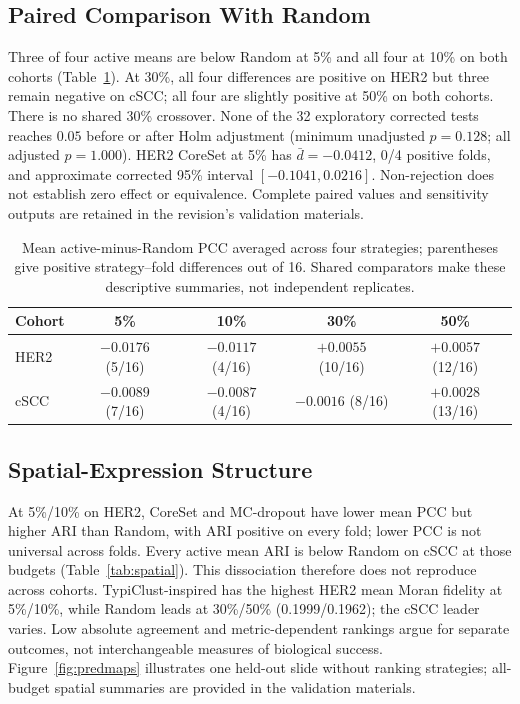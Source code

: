 \documentclass[]{spie}
\begin{document}
\subsection{Paired Comparison With Random}

Three of four active means are below Random at 5\% and all four at 10\% on both cohorts (Table~\ref{tab:paired}). At 30\%, all four differences are positive on HER2 but three remain negative on cSCC; all four are slightly positive at 50\% on both cohorts. There is no shared 30\% crossover. None of the 32 exploratory corrected tests reaches $0.05$ before or after Holm adjustment (minimum unadjusted $p=0.128$; all adjusted $p=1.000$). HER2 CoreSet at 5\% has $\bar d=-0.0412$, 0/4 positive folds, and approximate corrected 95\% interval $[-0.1041,0.0216]$. Non-rejection does not establish zero effect or equivalence. Complete paired values and sensitivity outputs are retained in the revision's validation materials.

\begin{table}[htbp]
\centering
\caption{Mean active-minus-Random PCC averaged across four strategies; parentheses give positive strategy--fold differences out of 16. Shared comparators make these descriptive summaries, not independent replicates.}
\label{tab:paired}
\begin{tabular}{lcccc}
\hline
Cohort & 5\% & 10\% & 30\% & 50\% \\
\hline
HER2 & $-0.0176$ (5/16) & $-0.0117$ (4/16) & $+0.0055$ (10/16) & $+0.0057$ (12/16) \\
cSCC & $-0.0089$ (7/16) & $-0.0087$ (4/16) & $-0.0016$ (8/16) & $+0.0028$ (13/16) \\
\hline
\end{tabular}
\end{table}

\subsection{Spatial-Expression Structure}

At 5\%/10\% on HER2, CoreSet and MC-dropout have lower mean PCC but higher ARI than Random, with ARI positive on every fold; lower PCC is not universal across folds. Every active mean ARI is below Random on cSCC at those budgets (Table~\ref{tab:spatial}). This dissociation therefore does not reproduce across cohorts. TypiClust-inspired has the highest HER2 mean Moran fidelity at 5\%/10\%, while Random leads at 30\%/50\% (0.1999/0.1962); the cSCC leader varies. Low absolute agreement and metric-dependent rankings argue for separate outcomes, not interchangeable measures of biological success. Figure~\ref{fig:predmaps} illustrates one held-out slide without ranking strategies; all-budget spatial summaries are provided in the validation materials.
\end{document}

